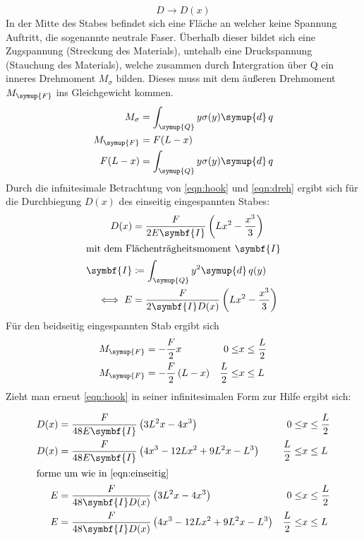 \begin{equation}
  D \to D(x)
\end{equation}
In der Mitte des Stabes befindet sich eine Fläche an welcher
keine Spannung Auftritt, die sogenannte neutrale Faser. Überhalb dieser
bildet sich eine Zugspannung (Streckung des Materials), untehalb eine Druckspannung
(Stauchung des Materials), welche zusammen durch Intergration über Q ein inneres Drehmoment $M_\sigma$ bilden.
Dieses muss mit dem äußeren Drehmoment $M_\symup{F}$ ins Gleichgewicht kommen.
\begin{align}
  M_\sigma &= \int_\symup{Q} y \sigma(y) \symup{d} \, q\\
  M_\symup{F} &= F(L-x)\\
  F(L-x) &= \int_\symup{Q} y \sigma(y) \symup{d} \, q
  \label{eqn:dreh}
\end{align}
Durch die infnitesimale Betrachtung von \eqref{eqn:hook} und \eqref{eqn:dreh} ergibt
sich für die Durchbiegung $D(x)$ des einseitig eingespannten Stabes:
\begin{align}
  D(x) &= \frac{F}{2E\symbf{I}}\left(Lx^2-\frac{x^3}{3}\right)\\
  \intertext{mit dem Flächenträgheitsmoment $\symbf{I}$}
\symbf{I} &\coloneq \int_\symup{Q} y^2 \symup{d}\, q(y)\\
\iff E &= \frac{F}{2\symbf{I}D(x)}\left(Lx^2-\frac{x^3}{3}\right)
\label{eqn:einseitig}
\end{align}
Für den beidseitig eingespannten Stab ergibt sich
\begin{align}
  M_\symup{F} &= -\frac{F}{2}x & 0 \leq &x \leq \frac{L}{2}\\
  M_\symup{F} &= -\frac{F}{2}\left(L-x\right) & \frac{L}{2} \leq &x \leq L\\
\end{align}
Zieht man erneut \eqref{eqn:hook} in seiner infinitesimalen Form zur Hilfe
ergibt sich:

\begin{align}
  D(x) &= \frac{F}{48E\symbf{I}}\left(3L^2x-4x^3\right)& 0 \leq &x \leq \frac{L}{2}\\
  D(x) &= \frac{F}{48E\symbf{I}}\left(4x^3-12Lx^2+9L^2x-L^3\right) & \frac{L}{2} \leq &x \leq L\\
  \intertext{forme um wie in \eqref{eqn:einseitig}}
  E &= \frac{F}{48\symbf{I}D(x)}\left(3L^2x-4x^3\right)& 0 \leq &x \leq \frac{L}{2}
  \label{eqn:beidseitigl}\\
  E &= \frac{F}{48\symbf{I}D(x)}\left(4x^3-12Lx^2+9L^2x-L^3\right) & \frac{L}{2} \leq &x \leq L
  \label{eqn:beidseitigr}
\end{align}

